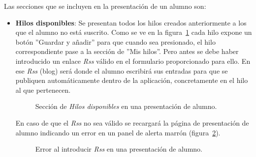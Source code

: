 \documentclass[a4paper, 12pt]{book}
\begin{document}
Las secciones que se incluyen en la presentaci\'on de un alumno son:

\begin{itemize}
  \item {\bfseries Hilos disponibles}: Se presentan todos los hilos creados anteriormente a los que el alumno no est\'a suscrito. Como se ve en la 
  figura~\ref{figura:alumno1} cada hilo expone un bot\'on ''Guardar y a\~nadir'' para que cuando sea presionado, el hilo correspondiente pase a la 
  secci\'on de ''Mis hilos''. Pero antes se debe haber introducido un enlace \textit{Rss} v\'alido en el formulario proporcionado para ello. En ese 
  \textit{Rss} (blog) ser\'a donde el alumno escribir\'a sus entradas para que se publiquen autom\'aticamente dentro de la aplicaci\'on, concretamente
  en el hilo al que pertenecen.
  \begin{figure}[htbp] 
    \centering
    \caption{Secci\'on de \textit{Hilos disponibles} en una presentaci\'on de alumno.}
    \label{figura:alumno1}
  \end{figure}
  
  En caso de que el \textit{Rss} no sea v\'alido se recargar\'a la p\'agina de presentaci\'on de alumno indicando un error en un panel de alerta marr\'on 
  (figura~\ref{figura:alumno2}).
  \begin{figure}[htbp] 
    \centering
    \caption{Error al introducir \textit{Rss} en una presentaci\'on de alumno.}
    \label{figura:alumno2}
  \end{figure}
  

\end{itemize}
\end{document}

